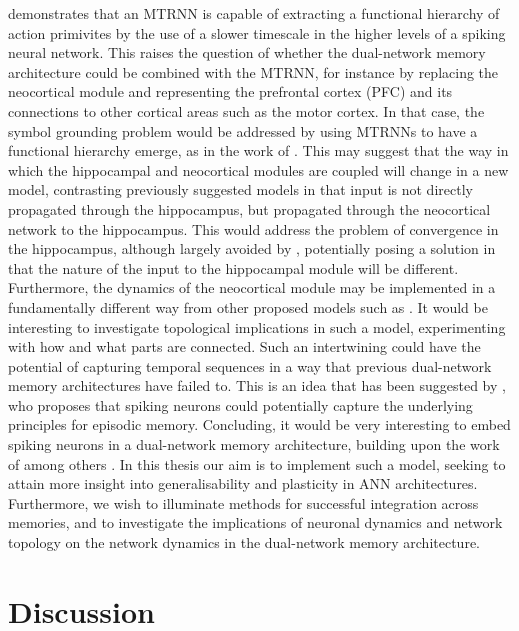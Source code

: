 \cite{Tani2014} demonstrates that an MTRNN is capable of extracting a functional hierarchy of action primivites by the use of a slower timescale in the higher levels of a spiking neural network. This raises the question of whether the dual-network memory architecture could be combined with the MTRNN, for instance by replacing the neocortical module and representing the prefrontal cortex (PFC) and its connections to other cortical areas such as the motor cortex. In that case, the symbol grounding problem would be addressed by using MTRNNs to have a functional hierarchy emerge, as in the work of \cite{Tani2014}. This may suggest that the way in which the hippocampal and neocortical modules are coupled will change in a new model, contrasting previously suggested models in that input is not directly propagated through the hippocampus, but propagated through the neocortical network to the hippocampus.
This would address the problem of convergence in the hippocampus, although largely avoided by \cite{Hattori2014}, potentially posing a solution in that the nature of the input to the hippocampal module will be different. Furthermore, the dynamics of the neocortical module may be implemented in a fundamentally different way from other proposed models such as \cite{Ans1997, Ans2000, French2001, Hattori2010, Hattori2014}. 
It would be interesting to investigate topological implications in such a model, experimenting with how and what parts are connected.
Such an intertwining could have the potential of capturing temporal sequences in a way that previous dual-network memory architectures have failed to. This is an idea that has been suggested by \cite{Hattori2014}, who proposes that spiking neurons could potentially capture the underlying principles for episodic memory. Concluding, it would be very interesting to embed spiking neurons in a dual-network memory architecture, building upon the work of among others \cite{Yamashita2008, McClelland1995, Hattori2014}. In this thesis our aim is to implement such a model, seeking to attain more insight into generalisability and plasticity in ANN architectures. Furthermore, we wish to illuminate methods for successful integration across memories, and to investigate the implications of neuronal dynamics and network topology on the network dynamics in the dual-network memory architecture.


\section{Discussion}

